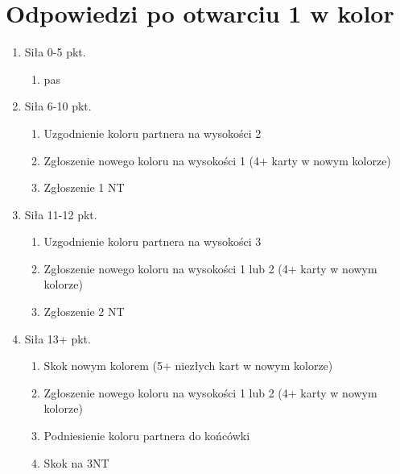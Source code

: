 \documentclass{article}
\begin{document}
    \section{Odpowiedzi po otwarciu 1 w kolor}
		\begin{enumerate}
  			\item Siła 0-5 pkt.
  			\begin{enumerate}
   				 \item pas
  			\end{enumerate}
  			\item Siła 6-10 pkt.
  			\begin{enumerate}
   				 \item Uzgodnienie koloru partnera na wysokości 2
   				 \item Zgłoszenie nowego koloru na wysokości 1 (4+ karty w nowym kolorze)
   				 \item Zgłoszenie 1 NT
  			\end{enumerate}
  			\item Siła 11-12 pkt.
  			\begin{enumerate}
   				 \item Uzgodnienie koloru partnera na wysokości 3
   				 \item Zgłoszenie nowego koloru na wysokości 1 lub 2 (4+ karty w nowym kolorze)
   				 \item Zgłoszenie 2 NT
  			\end{enumerate}
  			\item Siła 13+ pkt.
  			\begin{enumerate}
   				 \item Skok nowym kolorem (5+ niezłych kart w nowym kolorze)
   				 \item Zgłoszenie nowego koloru na wysokości 1 lub 2 (4+ karty w nowym kolorze)
   				 \item Podniesienie koloru partnera do końcówki
   				 \item Skok na 3NT
  			\end{enumerate}
		\end{enumerate}
\end{document}
